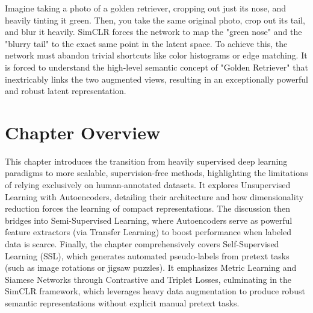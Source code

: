 \begin{insightbox}
Imagine taking a photo of a golden retriever, cropping out just its nose, and heavily tinting it green. Then, you take the same original photo, crop out its tail, and blur it heavily. SimCLR forces the network to map the "green nose" and the "blurry tail" to the exact same point in the latent space. To achieve this, the network must abandon trivial shortcuts like color histograms or edge matching. It is forced to understand the high-level semantic concept of "Golden Retriever" that inextricably links the two augmented views, resulting in an exceptionally powerful and robust latent representation.
\end{insightbox}

\section{Chapter Overview}

This chapter introduces the transition from heavily supervised deep learning paradigms to more scalable, supervision-free methods, highlighting the limitations of relying exclusively on human-annotated datasets. It explores Unsupervised Learning with Autoencoders, detailing their architecture and how dimensionality reduction forces the learning of compact representations. The discussion then bridges into Semi-Supervised Learning, where Autoencoders serve as powerful feature extractors (via Transfer Learning) to boost performance when labeled data is scarce. Finally, the chapter comprehensively covers Self-Supervised Learning (SSL), which generates automated pseudo-labels from pretext tasks (such as image rotations or jigsaw puzzles). It emphasizes Metric Learning and Siamese Networks through Contrastive and Triplet Losses, culminating in the SimCLR framework, which leverages heavy data augmentation to produce robust semantic representations without explicit manual pretext tasks.

